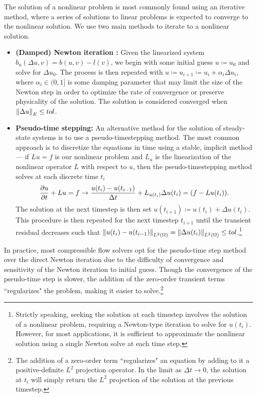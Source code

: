 The solution of a nonlinear problem is most commonly found using an iterative method, where a series of solutions to linear problems is expected to converge to the nonlinear solution.  We use two main methods to iterate to a nonlinear solution.  
\begin{itemize}
\item{} \textbf{(Damped) Newton iteration :} Given the linearized system $b_u(\Delta u,v) = b(u,v)-l(v)$, we begin with some initial guess $u\coloneqq u_0$ and solve for $\Delta u_0$.  The process is then repeated with $u\coloneqq u_{i+1} \coloneqq u_i + \alpha_i \Delta u_i$, where $\alpha_i \in (0,1]$ is some damping parameter that may limit the size of the Newton step in order to optimize the rate of convergence or preserve physicality of the solution.  The solution is considered converged when $\nor{\Delta u}_E \leq tol$.  
\item{} \textbf{Pseudo-time stepping: } An alternative method for the solution of steady-state systems is to use a pseudo-timestepping method.  The most common approach is to discretize the equations in time using a stable, implicit method --- if $Lu = f$ is our nonlinear problem and $L_u$ is the linearization of the nonlinear operator $L$ with respect to $u$, then the pseudo-timestepping method solves at each discrete time $t_{i}$
\[
\pd{u}{t} + Lu = f \rightarrow \frac{u(t_i) - u(t_{i-1})}{\Delta t} + L_{u(t_i)}\Delta u(t_i) = (f - Lu(t_i)).
\]
The solution at the next timestep is then set $u(t_{i+1}) \coloneqq u(t_i) + \Delta u(t_i)$.  This procedure is then repeated for the next timestep $t_{i+1}$ until the transient residual decreases such that $\nor{u(t_i) - u(t_{i-1})}_{L^2(\Omega)} = \nor{\Delta u(t_i)}_{L^2(\Omega)} \leq tol$.\footnote{Strictly speaking, seeking the solution at each timestep involves the solution of a nonlinear problem, requiring a Newton-type iteration to solve for $u(t_i)$.  However, for most applications, it is sufficient to approximate the nonlinear solution using a single Newton solve at each time step.} 
\end{itemize}

In practice, most compressible flow solvers opt for the pseudo-time step method over the direct Newton iteration due to the difficulty of convergence and sensitivity of the Newton iteration to initial guess\cite{libMeshPaper}.  Though the convergence of the pseudo-time step is slower, the addition of the zero-order transient terms ``regularizes" the problem, making it easier to solve.\footnote{The addition of a zero-order term ``regularizes" an equation by adding to it a positive-definite $L^2$ projection operator.  In the limit as $\Delta t\rightarrow 0$, the solution at $t_i$ will simply return the $L^2$ projection of the solution at the previous timestep.}

